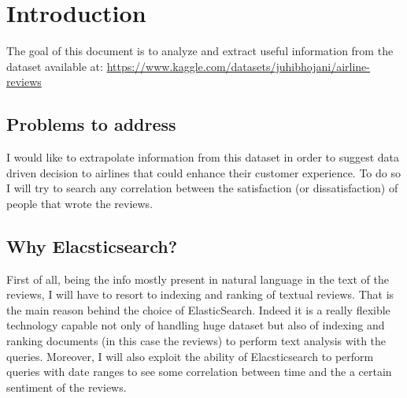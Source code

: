 \documentclass{Configuration_Files/PoliMi3i_thesis}
\begin{document}
\mainmatter %

\chapter{Introduction}
The goal of this document is to analyze and extract useful information from the dataset available at:
\newline 
\href{https://www.kaggle.com/datasets/juhibhojani/airline-reviews}{https://www.kaggle.com/datasets/juhibhojani/airline-reviews}
\section{Problems to address}
I would like to extrapolate information from this dataset in order to suggest data driven decision to airlines that could enhance their customer experience. To do so I will try to search any correlation between the satisfaction (or dissatisfaction) of people that wrote the reviews. 

\section {Why Elacsticsearch?}

First of all, being the info mostly present in natural language in the text of the reviews, I will have to resort to indexing and ranking of textual reviews. That is the main reason behind the choice of ElasticSearch. Indeed it is a really flexible technology capable not only of handling huge dataset but also of indexing and ranking documents (in this case the reviews) to perform text analysis with the queries. Moreover, I will also exploit the ability of Elacsticsearch to perform queries with date ranges to see some correlation between time and the a certain sentiment of the reviews.

\end{document}
